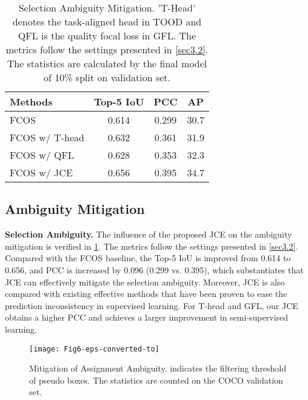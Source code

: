 \documentclass[10pt,twocolumn,letterpaper]{article}
\begin{document}
\begin{table}[t]
\setlength{\belowcaptionskip}{-5pt}
    \caption{Selection Ambiguity Mitigation. 'T-Head' denotes the task-aligned head in TOOD and QFL is the quality focal loss in GFL. The metrics follow the settings presented in \cref{sec3.2}. The statistics are calculated by the final model of 10\% split on validation set.}
    \centering
    \begin{tabular}{lccc}
    \hline
    Methods & Top-5 IoU & PCC & AP\\
    \hline
    FCOS           & 0.614 & 0.299 & 30.7 \\
    FCOS w/ T-head\cite{Tood} & 0.632 & 0.361 & 31.9 \\
    FCOS w/ QFL\cite{GFL}    & 0.628 & 0.353 & 32.3 \\
    FCOS w/ JCE    & 0.656 & 0.395 & 34.7 \\ 
    \hline
    \end{tabular}
    \label{table8}
\end{table}

\subsection{Ambiguity Mitigation}
\label{sec4.4}

\noindent\textbf{Selection Ambiguity.} 
The influence of the proposed JCE on the ambiguity mitigation is verified in \cref{table8}.
The metrics follow the settings presented in \cref{sec3.2}.
Compared with the FCOS baseline, the Top-5 IoU is improved from 0.614 to 0.656, and PCC is increased by 0.096 (0.299 vs. 0.395), which substantiates that JCE can effectively mitigate the selection ambiguity.
Moreover, JCE is also compared with existing effective methods that have been proven to ease the prediction inconsistency in supervised learning.
For T-head and GFL, our JCE obtains a higher PCC and achieves a larger improvement in semi-supervised learning.

\begin{figure}[t]
  \centering
  \setlength{\abovecaptionskip}{5pt}
  \setlength{\belowcaptionskip}{-15pt}
   \texttt{[image: Fig6-eps-converted-to]}
   \caption{Mitigation of Assignment Ambiguity.  indicates the filtering threshold of pseudo boxes. The statistics are counted on the COCO validation set.}
   \label{fig6}
\end{figure}
\end{document}
